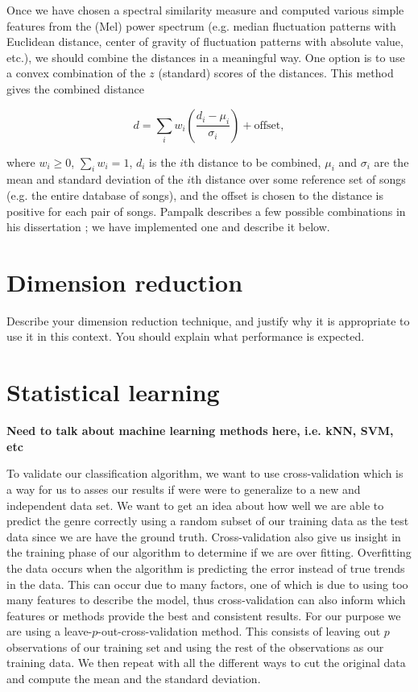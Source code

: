 \documentclass[12pt]{article}
\begin{document}
Once we have chosen a spectral similarity measure and computed various simple features from the (Mel) power spectrum (e.g. median fluctuation patterns with Euclidean distance, center of gravity of fluctuation patterns with absolute value, etc.), we should combine the distances in a meaningful way.  One option is to use a convex combination of the $z$ (standard) scores of the distances.  This method gives the combined distance

\[ d = \sum_{i} w_i \left(\dfrac{d_i - \mu_i}{\sigma_i}\right) + \text{offset}, \] 

\noindent where $w_i\ge 0$, $\sum_i w_i=1$, $d_i$ is the $i$th distance to be combined, $\mu_i$ and $\sigma_i$ are the mean and standard deviation of the $i$th distance over some reference set of songs (e.g. the entire database of songs), and the offset is chosen to the distance is positive for each pair of songs.  Pampalk describes a few possible combinations in his dissertation \cite{pampalk:dissertation}; we have implemented one and describe it below.\\


\section{Dimension reduction}
Describe your dimension reduction technique, and justify why it 
is appropriate to use it in this context. You should explain what 
performance is expected.
\section{Statistical learning}
\textbf{Need to talk about machine learning methods here, i.e. kNN, SVM, etc}

To validate our classification algorithm, we want to use cross-validation which is a way for us to asses our results if were were to generalize to a new and independent data set. We want to get an idea about how well we are able to predict the genre correctly using a random subset of our training data as the test data since we are have the ground truth. Cross-validation also give us insight in the training phase of our algorithm to determine if we are over fitting. Overfitting the data occurs when the algorithm is predicting the error instead of true trends in the data. This can occur due to many factors, one of which is due to using too many features to describe the model, thus cross-validation can also inform which features or methods provide the best and consistent results. For our purpose we are using a leave-$p$-out-cross-validation method. This consists of leaving out $p$ observations of our training set and using the rest of the observations as our training data. We then repeat with all the different ways to cut the original data and compute the mean and the standard deviation. 
\end{document}
